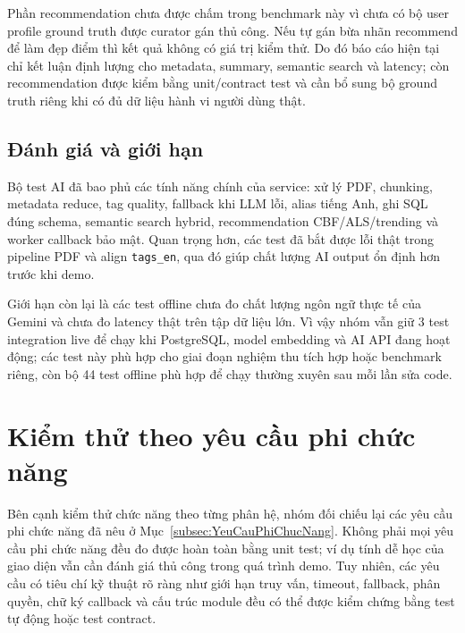 Phần recommendation chưa được chấm trong benchmark này vì chưa có bộ user
profile ground truth được curator gán thủ công. Nếu tự gán bừa nhãn recommend để
làm đẹp điểm thì kết quả không có giá trị kiểm thử. Do đó báo cáo hiện tại chỉ
kết luận định lượng cho metadata, summary, semantic search và latency; còn
recommendation được kiểm bằng unit/contract test và cần bổ sung bộ ground truth
riêng khi có đủ dữ liệu hành vi người dùng thật.

\subsection{Đánh giá và giới hạn}

Bộ test AI đã bao phủ các tính năng chính của service: xử lý PDF,
chunking, metadata reduce, tag quality, fallback khi LLM lỗi, alias tiếng Anh,
ghi SQL đúng schema, semantic search hybrid, recommendation CBF/ALS/trending và
worker callback bảo mật. Quan trọng hơn, các test đã bắt được lỗi thật trong
pipeline PDF và align \texttt{tags\_en}, qua đó giúp chất lượng AI output ổn
định hơn trước khi demo.

Giới hạn còn lại là các test offline chưa đo chất lượng ngôn ngữ thực tế của
Gemini và chưa đo latency thật trên tập dữ liệu lớn. Vì vậy nhóm vẫn giữ 3 test
integration live để chạy khi PostgreSQL, model embedding và AI API đang hoạt
động; các test này phù hợp cho giai đoạn nghiệm thu tích hợp hoặc benchmark
riêng, còn bộ 44 test offline phù hợp để chạy thường xuyên sau mỗi lần sửa code.

\section{Kiểm thử theo yêu cầu phi chức năng}

Bên cạnh kiểm thử chức năng theo từng phân hệ, nhóm đối chiếu lại các yêu cầu
phi chức năng đã nêu ở Mục~\ref{subsec:YeuCauPhiChucNang}. Không phải mọi yêu
cầu phi chức năng đều đo được hoàn toàn bằng unit test; ví dụ tính dễ học của
giao diện vẫn cần đánh giá thủ công trong quá trình demo. Tuy nhiên, các yêu
cầu có tiêu chí kỹ thuật rõ ràng như giới hạn truy vấn, timeout, fallback,
phân quyền, chữ ký callback và cấu trúc module đều có thể được kiểm chứng bằng
test tự động hoặc test contract.

